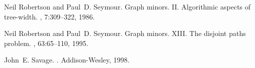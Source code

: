\documentclass[a4paper,11pt]{article}
\theoremstyle{definition}
\theoremstyle{remark}
\begin{document}
\begin{thebibliography}{10}
Neil Robertson and Paul~D. Seymour.
\newblock Graph minors. {II}. {A}lgorithmic aspects of tree-width.
, 7:309--322, 1986.

Neil Robertson and Paul~D. Seymour.
\newblock Graph minors. {XIII}. {T}he disjoint paths problem.
, 63:65--110, 1995.

John~E. Savage.
.
\newblock Addison-Wesley, 1998.

\end{thebibliography}
\end{document}
